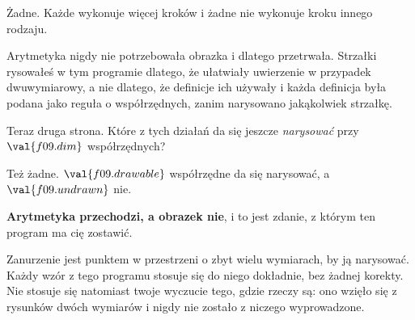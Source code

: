 \begin{fr}
\begin{ansblock}
Żadne. Każde wykonuje więcej kroków i żadne nie wykonuje kroku innego rodzaju.
\end{ansblock}

Arytmetyka nigdy nie potrzebowała obrazka i dlatego przetrwała. Strzałki
rysowałeś w tym programie dlatego, że ułatwiały uwierzenie w przypadek
dwuwymiarowy, a nie dlatego, że definicje ich używały \dash{} i każda definicja
była podana jako reguła o współrzędnych, zanim narysowano jakąkolwiek strzałkę.

Teraz druga strona. Które z tych działań da się jeszcze \emph{narysować} przy
$\val{f09.dim}$ współrzędnych?
\nextframe
\end{fr}

\begin{fr}
\begin{ansblock}
Też żadne. $\val{f09.drawable}$ współrzędne da się narysować, a
$\val{f09.undrawn}$ nie.
\end{ansblock}

\textbf{Arytmetyka przechodzi, a obrazek nie}, i to jest zdanie, z którym ten
program ma cię zostawić.

Zanurzenie jest punktem w przestrzeni o zbyt wielu wymiarach, by ją narysować.
Każdy wzór z tego programu stosuje się do niego dokładnie, bez żadnej korekty.
Nie stosuje się natomiast twoje wyczucie tego, gdzie rzeczy są: ono wzięło się
z rysunków dwóch wymiarów i nigdy nie zostało z niczego wyprowadzone.
\end{fr}

